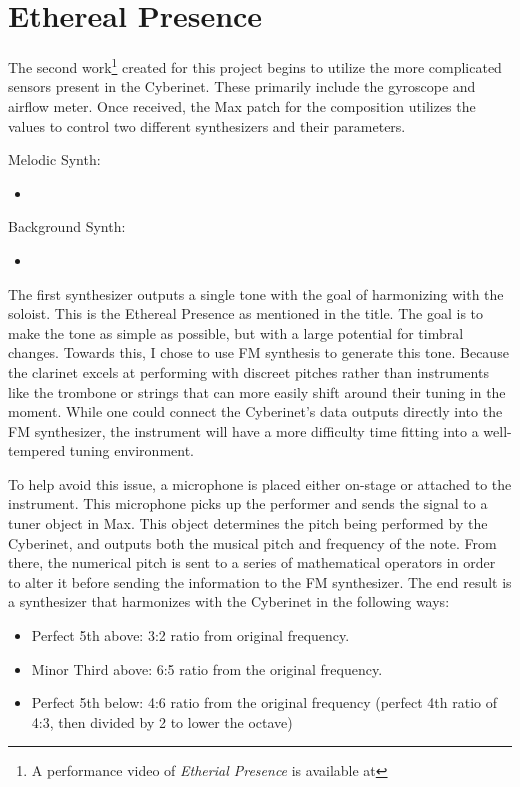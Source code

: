 \section{Ethereal Presence}
The second work\footnote{A performance video of \textit{Etherial Presence} is available at} created for this project begins to utilize the more complicated sensors present in the Cyberinet. These primarily include the gyroscope and airflow meter. Once received, the Max patch for the composition utilizes the values to control two different synthesizers and their parameters. 

Melodic Synth:
\begin{itemize}
    \item 
\end{itemize}

Background Synth:
\begin{itemize}
    \item 
\end{itemize}

The first synthesizer outputs a single tone with the goal of harmonizing with the soloist. This is the Ethereal Presence as mentioned in the title. The goal is to make the tone as simple as possible, but with a large potential for timbral changes. Towards this, I chose to use FM synthesis to generate this tone. Because the clarinet excels at performing with discreet pitches rather than instruments like the trombone or strings that can more easily shift around their tuning in the moment. While one could connect the Cyberinet's data outputs directly into the FM synthesizer, the instrument will have a more difficulty time fitting into a well-tempered tuning environment. 

To help avoid this issue, a microphone is placed either on-stage or attached to the instrument. This microphone picks up the performer and sends the signal to a tuner object in Max. This object determines the pitch being performed by the Cyberinet, and outputs both the musical pitch and frequency of the note. From there, the numerical pitch is sent to a series of mathematical operators in order to alter it before sending the information to the FM synthesizer. The end result is a synthesizer that harmonizes with the Cyberinet in the following ways:

\begin{itemize}
    \item Perfect 5th above: 3:2 ratio from original frequency.
    \item Minor Third above: 6:5 ratio from the original frequency.
    \item Perfect 5th below: 4:6 ratio from the original frequency (perfect 4th ratio of 4:3, then divided by 2 to lower the octave) 
\end{itemize}

